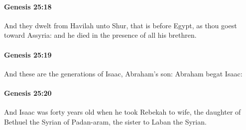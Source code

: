 		\paragraph{Genesis 25:18} %
			\label{GENESIS-25-18}

			And they dwelt from Havilah unto Shur, that is before Egypt, as thou goest toward Assyria: and he died in the presence of all his brethren.


		\paragraph{Genesis 25:19} %
			\label{GENESIS-25-19}

			And these are the generations of Isaac, Abraham's son: Abraham begat Isaac:


		\paragraph{Genesis 25:20} %
			\label{GENESIS-25-20}

			And Isaac was forty years old when he took Rebekah to wife, the daughter of Bethuel the Syrian of Padan-aram, the sister to Laban the Syrian.


